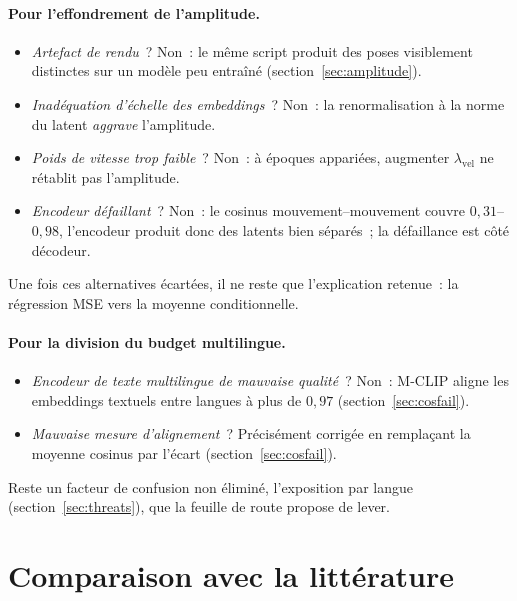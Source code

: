 \documentclass[12pt,a4paper,oneside]{report}
\theoremstyle{definition}
\theoremstyle{plain}
\newcommand{\lvel}{\ensuremath{\lambda_{\mathrm{vel}}}}
\begin{document}
\paragraph{Pour l'effondrement de l'amplitude.}
\begin{itemize}[leftmargin=*]
\item \emph{Artefact de rendu}~? Non~: le même script produit des poses visiblement
distinctes sur un modèle peu entraîné (section~\ref{sec:amplitude}).
\item \emph{Inadéquation d'échelle des embeddings}~? Non~: la renormalisation à la
norme du latent \emph{aggrave} l'amplitude.
\item \emph{Poids de vitesse trop faible}~? Non~: à époques appariées, augmenter
$\lvel$ ne rétablit pas l'amplitude.
\item \emph{Encodeur défaillant}~? Non~: le cosinus mouvement--mouvement couvre
$0{,}31$--$0{,}98$, l'encodeur produit donc des latents bien séparés~; la défaillance
est côté décodeur.
\end{itemize}
Une fois ces alternatives écartées, il ne reste que l'explication retenue~: la
régression MSE vers la moyenne conditionnelle.

\paragraph{Pour la division du budget multilingue.}
\begin{itemize}[leftmargin=*]
\item \emph{Encodeur de texte multilingue de mauvaise qualité}~? Non~: M-CLIP aligne
les embeddings textuels entre langues à plus de $0{,}97$ (section~\ref{sec:cosfail}).
\item \emph{Mauvaise mesure d'alignement}~? Précisément corrigée en remplaçant la
moyenne cosinus par l'écart (section~\ref{sec:cosfail}).
\end{itemize}
Reste un facteur de confusion non éliminé, l'exposition par langue
(section~\ref{sec:threats}), que la feuille de route propose de lever.

\section{Comparaison avec la littérature}
\label{sec:litterature}
\end{document}
